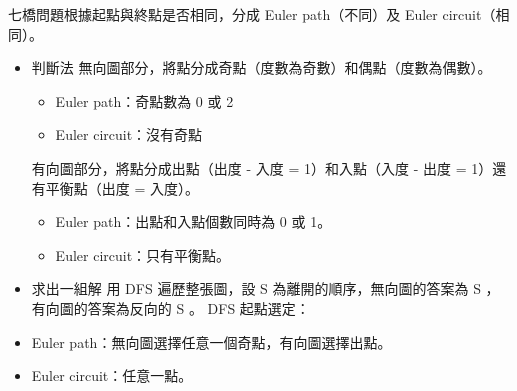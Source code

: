七橋問題根據起點與終點是否相同，分成 Euler path（不同）及 Euler circuit（相同）。

\begin{itemize}
    \item 判斷法
    無向圖部分，將點分成奇點（度數為奇數）和偶點（度數為偶數）。
    \begin{itemize}
        \item Euler path：奇點數為 0 或 2
        \item Euler circuit：沒有奇點
    \end{itemize}
    有向圖部分，將點分成出點（出度 - 入度 = 1）和入點（入度 - 出度 = 1）還有平衡點（出度 = 入度）。
    \begin{itemize}
        \item Euler path：出點和入點個數同時為 0 或 1。
        \item Euler circuit：只有平衡點。
    \end{itemize}
    \item 求出一組解
    用 DFS 遍歷整張圖，設 S 為離開的順序，無向圖的答案為 S ，有向圖的答案為反向的 S 。
    DFS 起點選定：
    \item Euler path：無向圖選擇任意一個奇點，有向圖選擇出點。
    \item Euler circuit：任意一點。
\end{itemize}